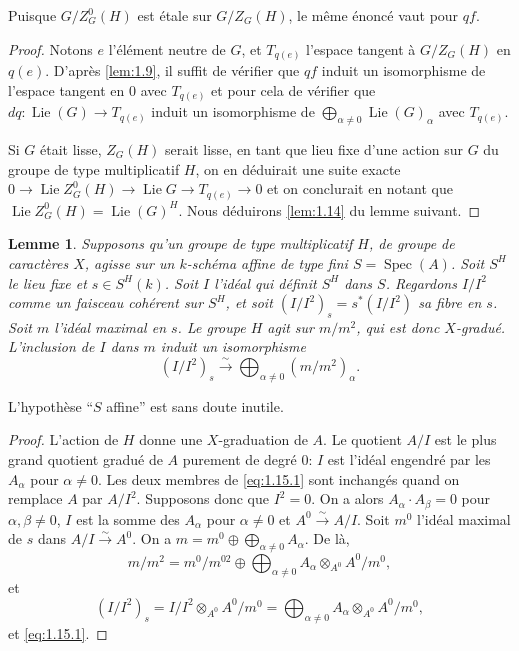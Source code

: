 \documentclass[11pt,a4paper]{article}
\theoremstyle{plain}
\newtheorem{lemma}[theorem]{Lemme}
\theoremstyle{definition}
\DeclareMathOperator{\Spec}{Spec}
\DeclareMathOperator{\Lie}{Lie}
\begin{document}
Puisque $G/Z^0_G(H)$ est \'etale sur $G/Z_G(H)$, le m\^eme \'enonc\'e vaut pour $qf$.

\begin{proof}
Notons $e$ l'\'el\'ement neutre de $G$, et $T_{q(e)}$ l'espace tangent \`a $G/Z_G(H)$ en $q(e)$. D'apr\`es \ref{lem:1.9}, il suffit de v\'erifier que $qf$ induit un isomorphisme de l'espace tangent en $0$ avec $T_{q(e)}$ et pour cela de v\'erifier que $dq: \Lie(G) \to T_{q(e)}$ induit un isomorphisme de $\bigoplus_{\alpha \neq 0} \Lie(G)_\alpha$ avec $T_{q(e)}$.

Si $G$ \'etait lisse, $Z_G(H)$ serait lisse, en tant que lieu fixe d'une action sur $G$ du groupe de type multiplicatif $H$, on en d\'eduirait une suite exacte $0 \to \Lie Z^0_G(H) \to \Lie G \to T_{q(e)} \to 0$ et on conclurait en notant que $\Lie Z^0_G(H) = \Lie(G)^H$. Nous d\'eduirons \ref{lem:1.14} du lemme suivant.
\end{proof}

\begin{lemma}\label{lem:1.15}
Supposons qu'un groupe de type multiplicatif $H$, de groupe de caract\`eres $X$, agisse sur un $k$-sch\'ema affine de type fini $S = \Spec(A)$. Soit $S^H$ le lieu fixe et $s \in S^H(k)$. Soit $I$ l'id\'eal qui d\'efinit $S^H$ dans $S$. Regardons $I/I^2$ comme un faisceau coh\'erent sur $S^H$, et soit $(I/I^2)_s = s^*(I/I^2)$ sa fibre en $s$. Soit $m$ l'id\'eal maximal en $s$. Le groupe $H$ agit sur $m/m^2$, qui est donc $X$-gradu\'e. L'inclusion de $I$ dans $m$ induit un isomorphisme
\begin{equation}\label{eq:1.15.1}
(I/I^2)_s \xrightarrow{\sim} \bigoplus_{\alpha \neq 0} (m/m^2)_\alpha.
\end{equation}
\end{lemma}

L'hypoth\`ese ``$S$ affine'' est sans doute inutile.

\begin{proof}
L'action de $H$ donne une $X$-graduation de $A$. Le quotient $A/I$ est le plus grand quotient gradu\'e de $A$ purement de degr\'e $0$: $I$ est l'id\'eal engendr\'e par les $A_\alpha$ pour $\alpha \neq 0$. Les deux membres de \eqref{eq:1.15.1} sont inchang\'es quand on remplace $A$ par $A/I^2$. Supposons donc que $I^2 = 0$. On a alors $A_\alpha \cdot A_\beta = 0$ pour $\alpha, \beta \neq 0$, $I$ est la somme des $A_\alpha$ pour $\alpha \neq 0$ et $A^0 \xrightarrow{\sim} A/I$. Soit $m^0$ l'id\'eal maximal de $s$ dans $A/I \xrightarrow{\sim} A^0$. On a $m = m^0 \oplus \bigoplus_{\alpha \neq 0} A_\alpha$. De l\`a,
\[
m/m^2 = m^0/m^{02} \oplus \bigoplus_{\alpha \neq 0} A_\alpha \otimes_{A^0} A^0/m^0,
\]
et
\[
(I/I^2)_s = I/I^2 \otimes_{A^0} A^0/m^0 = \bigoplus_{\alpha \neq 0} A_\alpha \otimes_{A^0} A^0/m^0,
\]
et \eqref{eq:1.15.1}.
\end{proof}
\end{document}
